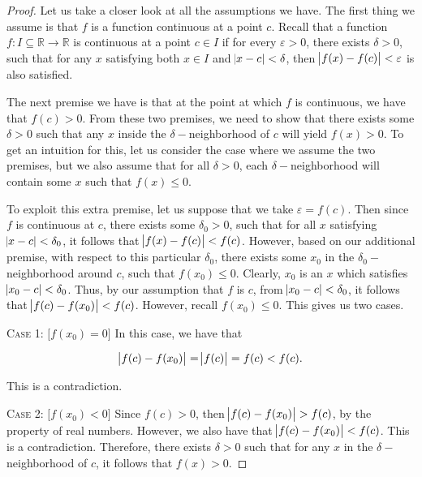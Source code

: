 \documentclass{article}
\theoremstyle{definition}
\theoremstyle{remark}
\theoremstyle{definition}
\begin{document}
\begin{enumerate}[leftmargin=*]
        \begin{proof}
            Let us take a closer look at all the assumptions we have. The first thing we assume is that $f$ is a function continuous at a point $c$. Recall that a function $f\colon I\subseteq\mathbb{R}\rightarrow\mathbb{R}$ is continuous at a point $c\in I$ if for every $\varepsilon>0$, there exists $\delta>0$, such that for any $x$ satisfying both $x\in I$ and $\abs{x-c}<\delta$, then $\abs{f(x)-f(c)}<\varepsilon$ is also satisfied.\hfill\par\hspace{4mm}The next premise we have is that at the point at which $f$ is continuous, we have that $f(c)>0$. From these two premises, we need to show that there exists some $\delta>0$ such that any $x$ inside the $\delta-$neighborhood of $c$ will yield $f(x)>0$. To get an intuition for this, let us consider the case where we assume the two premises, but we also assume that for all $\delta>0$, each $\delta-$neighborhood will contain some $x$ such that $f(x)\leq 0$.\hfill\par\hspace{4mm} To exploit this extra premise, let us suppose that we take $\varepsilon=f(c)$. Then since $f$ is continuous at $c$, there exists some $\delta_0>0$, such that for all $x$ satisfying $\abs{x-c}<\delta_0$, it follows that $\abs{f(x)-f(c)}<f(c)$. However, based on our additional premise, with respect to this particular $\delta_0$, there exists some $x_0$ in the $\delta_0-$neighborhood around $c$, such that $f(x_0)\leq 0$. Clearly, $x_0$ is an $x$ which satisfies $\abs{x_0-c}<\delta_0$. Thus, by our assumption that $f$ is $c$, from $\abs{x_0-c}<\delta_0$, it follows that $\abs{f(c)-f(x_0)}<f(c)$. However, recall $f(x_0)\leq 0$. This gives us two cases.
            
            \vspace{4mm}
            
            \noindent\textsc{Case 1:} $\big[f(x_0)=0\big]$ In this case, we have that
            
            \begin{equation*}
                \abs{f(c)-f(x_0)}=\abs{f(c)}=f(c)<f(c).
            \end{equation*}
            
            This is a contradiction.
            
            \vspace{2mm}
            
            \noindent\textsc{Case 2:} $\big[f(x_0)<0\big]$ Since $f(c)>0$, then $\abs{f(c)-f(x_0)}>f(c)$, by the property of real numbers. However, we also have that $\abs{f(c)-f(x_0)}<f(c)$. This is a contradiction. Therefore, there exists $\delta>0$ such that for any $x$ in the $\delta-$neighborhood of $c$, it follows that $f(x)>0$.
            

\end{proof}
\end{enumerate}
\end{document}
